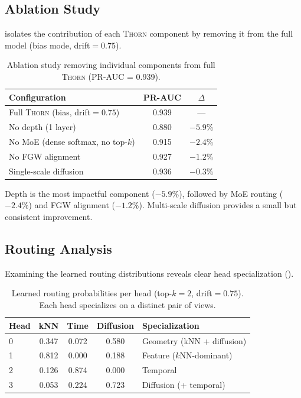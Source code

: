 \documentclass[11pt,a4paper]{article}
\newcommand{\thorn}{\textsc{Thorn}}
\begin{document}
\subsection{Ablation Study}
\label{sec:ablation}

 isolates the contribution of each \thorn{} component
by removing it from the full model (bias mode, drift${}=0.75$).

\begin{table}[t]
\centering
\caption{Ablation study removing individual components from full
\thorn{} (PR-AUC = 0.939).}
\label{tab:ablation}
\begin{tabular}{@{}lcc@{}}
\toprule
Configuration & PR-AUC & $\Delta$ \\
\midrule
Full \thorn{} (bias, drift${}=0.75$) & 0.939 & --- \\
\midrule
No depth (1 layer) & 0.880 & $-5.9\%$ \\
No MoE (dense softmax, no top-$k$) & 0.915 & $-2.4\%$ \\
No FGW alignment & 0.927 & $-1.2\%$ \\
Single-scale diffusion & 0.936 & $-0.3\%$ \\
\bottomrule
\end{tabular}
\end{table}

Depth is the most impactful component ($-5.9\%$), followed by MoE
routing ($-2.4\%$) and FGW alignment ($-1.2\%$).
Multi-scale diffusion provides a small but consistent improvement.

\subsection{Routing Analysis}
\label{sec:routing_analysis}

Examining the learned routing distributions reveals clear head
specialization ().

\begin{table}[t]
\centering
\caption{Learned routing probabilities per head (top-$k=2$, drift${}=0.75$).
Each head specializes on a distinct pair of views.}
\label{tab:routing}
\begin{tabular}{@{}lcccl@{}}
\toprule
Head & kNN & Time & Diffusion & Specialization \\
\midrule
0 & 0.347 & 0.072 & 0.580 & Geometry (kNN + diffusion) \\
1 & 0.812 & 0.000 & 0.188 & Feature ($k$NN-dominant) \\
2 & 0.126 & 0.874 & 0.000 & Temporal \\
3 & 0.053 & 0.224 & 0.723 & Diffusion (+ temporal) \\
\bottomrule
\end{tabular}
\end{table}
\end{document}
